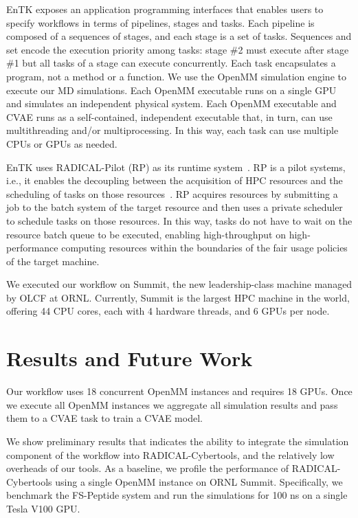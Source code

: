 \documentclass[conference,final]{IEEEtran}
\begin{document}
EnTK exposes an application programming interfaces that enables users to
specify workflows in terms of pipelines, stages and tasks. Each pipeline is
composed of a sequences of stages, and each stage is a set of tasks.
Sequences and set encode the execution priority among tasks: stage \#2 must
execute after stage \#1 but all tasks of a stage can execute concurrently.
Each task encapsulates a program, not a method or a function. We use the
OpenMM simulation engine to execute our MD simulations. Each OpenMM
executable runs on a single GPU and simulates an independent physical system.
Each OpenMM executable and CVAE runs as a self-contained, independent
executable that, in turn, can use multithreading and/or multiprocessing. In
this way, each task can use multiple CPUs or GPUs as needed.

EnTK uses RADICAL-Pilot (RP) as its runtime system~\cite{merzky2018using}. RP
is a pilot systems, i.e., it enables the decoupling between the acquisition
of HPC resources and the scheduling of tasks on those
resources~\cite{turilli2018comprehensive}. RP acquires resources by
submitting a job to the batch system of the target resource and then uses a
private scheduler to schedule tasks on those resources. In this way, tasks do
not have to wait on the resource batch queue to be executed, enabling
high-throughput on high-performance computing resources within the boundaries
of the fair usage policies of the target machine.

We executed our workflow on Summit, the new leadership-class machine managed
by OLCF at ORNL\@. Currently, Summit is the largest HPC machine in the world,
offering 44 CPU cores, each with 4 hardware threads, and 6 GPUs per node.


\section{Results and Future Work}

Our workflow uses 18 concurrent OpenMM instances and requires 18 GPUs. Once
we execute all OpenMM instances we aggregate all simulation results and pass
them to a CVAE task %
to train a CVAE model.

We show preliminary results that indicates the ability to integrate the
simulation component of the workflow into RADICAL-Cybertools, and the
relatively low overheads of our tools.  As a baseline, we profile the
performance of RADICAL-Cybertools using a single OpenMM instance on ORNL
Summit. Specifically, we benchmark the FS-Peptide system and run the
simulations for 100 ns on a single Tesla V100 GPU. 
\end{document}
